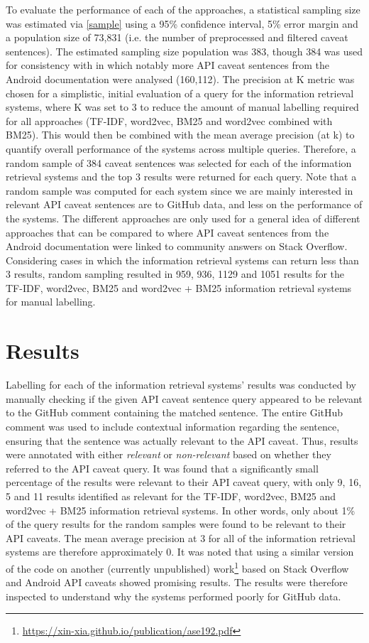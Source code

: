 To evaluate the performance of each of the approaches, a statistical sampling size was estimated via \ref{sample} using a 95\% confidence interval, 5\% error margin and a population size of 73,831 (i.e. the number of preprocessed and filtered caveat sentences). The estimated sampling size population was 383, though 384 was used for consistency with \cite{xiaoxue} in which notably more API caveat sentences from the Android documentation were analysed (160,112). The precision at K metric was chosen for a simplistic, initial evaluation of a query for the information retrieval systems, where K was set to 3 to reduce the amount of manual labelling required for all approaches (TF-IDF, word2vec, BM25 and word2vec combined with BM25). This would then be combined with the mean average precision (at k) to quantify overall performance of the systems across multiple queries. Therefore, a random sample of 384 caveat sentences was selected for each of the information retrieval systems and the top 3 results were returned for each query. Note that a random sample was computed for each system since we are mainly interested in relevant API caveat sentences are to GitHub data, and less on the performance of the systems. The different approaches are only used for a general idea of different approaches that can be compared to \cite{jiamou} where API caveat sentences from the Android documentation were linked to community answers on Stack Overflow. Considering cases in which the information retrieval systems can return less than 3 results, random sampling resulted in 959, 936, 1129 and 1051 results for the TF-IDF, word2vec, BM25 and word2vec + BM25 information retrieval systems for manual labelling.

\section{Results}
\label{sec:info-results}
Labelling for each of the information retrieval systems' results was conducted by manually checking if the given API caveat sentence query appeared to be relevant to the GitHub comment containing the matched sentence. The entire GitHub comment was used to include contextual information regarding the sentence, ensuring that the sentence was actually relevant to the API caveat. Thus, results were annotated with either \textit{relevant} or \textit{non-relevant} based on whether they referred to the API caveat query. It was found that a significantly small percentage of the results were relevant to their API caveat query, with only 9, 16, 5 and 11 results identified as relevant for the TF-IDF, word2vec, BM25 and word2vec + BM25 information retrieval systems. In other words, only about 1\% of the query results for the random samples were found to be relevant to their API caveats. The mean average precision at 3 for all of the information retrieval systems are therefore approximately 0. It was noted that using a similar version of the code on another (currently unpublished) work\footnote{\url{https://xin-xia.github.io/publication/ase192.pdf}} based on Stack Overflow and Android API caveats showed promising results. The results were therefore inspected to understand why the systems performed poorly for GitHub data.\\

